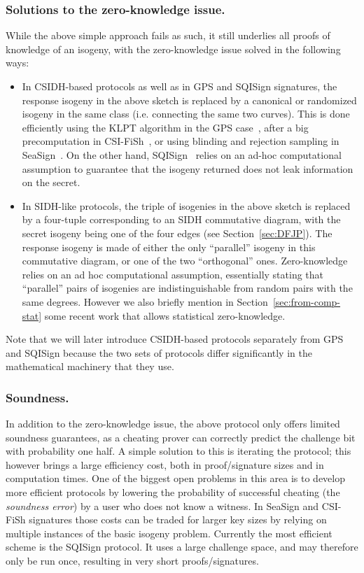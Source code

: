 \documentclass{llncs}
\begin{document}
\subsubsection{Solutions to the zero-knowledge issue.}
While the above simple approach fails  as such, it still underlies all proofs of knowledge of an isogeny, with the zero-knowledge issue solved in the following ways:
\begin{itemize}
    \item In CSIDH-based protocols as well as in GPS and SQISign signatures, the response isogeny in the above sketch is replaced by a canonical or randomized isogeny in the same class (i.e. connecting the same two curves). This is done efficiently using the KLPT algorithm in the GPS case~\cite{GPS20}, after a big precomputation in CSI-FiSh~\cite{CSI-FiSh}, or using blinding and rejection sampling in SeaSign~\cite{SeaSign}. On the other hand, SQISign~\cite{DFKLPW20} relies on an ad-hoc computational assumption to guarantee that the isogeny returned does not leak information on the secret.
%
    \item In SIDH-like protocols, the triple of isogenies in the above sketch is replaced by a four-tuple corresponding to an SIDH commutative diagram, with the secret isogeny being one of the four edges (see Section~\ref{sec:DFJP}).  The response isogeny is made of either the only ``parallel'' isogeny in this commutative diagram, or one of the two ``orthogonal'' ones. %
    Zero-knowledge relies on  an ad hoc computational assumption, essentially stating that ``parallel'' pairs of isogenies are indistinguishable from random pairs with the same degrees.
    However we also briefly mention in Section~\ref{sec:from-comp-stat} some recent work that allows statistical zero-knowledge.
\end{itemize}

    Note that we will later introduce CSIDH-based protocols separately from GPS and SQISign because the two sets of protocols differ significantly in the mathematical machinery that they use.

\subsubsection{Soundness.} In addition to the zero-knowledge issue, the above protocol  only offers limited soundness guarantees, as a cheating prover can correctly predict the challenge bit with probability one half. 
%
A simple solution to this is iterating the protocol; this however brings a large efficiency cost, both in proof/signature sizes and in computation times.
One of the biggest open problems in this area is to develop more efficient protocols by lowering the probability of successful cheating (the \emph{soundness error}) by a user who does not know a witness.
%
In SeaSign and CSI-FiSh signatures those costs can be traded for larger key sizes by relying on multiple instances of the basic isogeny problem.
%
Currently the most efficient scheme is the SQISign protocol. It uses a large challenge space, and may therefore only be run once, resulting in very short proofs/signatures.
\end{document}

